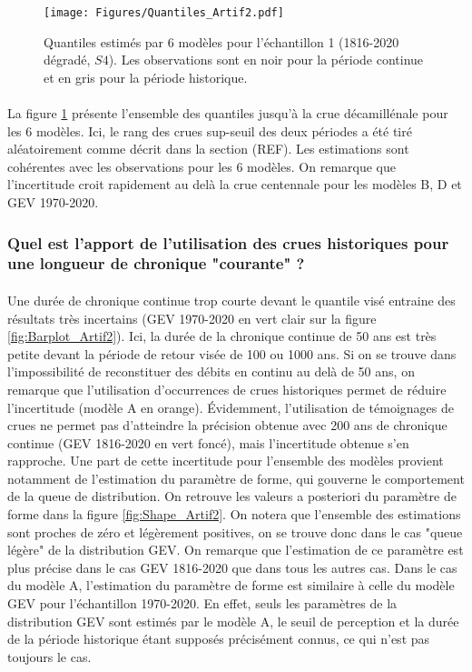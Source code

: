 \documentclass[11pt]{article}
\begin{document}
	\begin{figure}[h]
		\centering
		\texttt{[image: Figures/Quantiles\_Artif2.pdf]}	
		\caption{Quantiles estimés par 6 modèles pour l'échantillon 1 (1816-2020 dégradé, $S4$). Les observations sont en noir pour la période continue et en gris pour la période historique.}
		\label{fig:Quantiles_Artif2}
	\end{figure}
	
	\paragraph{} La figure \ref{fig:Quantiles_Artif2} présente l'ensemble des quantiles jusqu'à la crue décamillénale pour les 6 modèles. Ici, le rang des crues sup-seuil des deux périodes a été tiré aléatoirement comme décrit dans la section (REF). Les estimations sont cohérentes avec les observations pour les 6 modèles. On remarque que l'incertitude croit rapidement au delà la crue centennale pour les modèles B, D et GEV 1970-2020. 

\FloatBarrier
	
	\subsubsection{Quel est l'apport de l'utilisation des crues historiques pour une longueur de chronique "courante" ?}
	
	\paragraph{} Une durée de chronique continue trop courte devant le quantile visé entraine des résultats très incertains (GEV 1970-2020 en vert clair sur la figure \ref{fig:Barplot_Artif2}). Ici, la durée de la chronique continue de 50 ans est très petite devant la période de retour visée de 100 ou 1000 ans. Si on se trouve dans l'impossibilité de reconstituer des débits en continu au delà de 50 ans, on remarque que l'utilisation d'occurrences de crues historiques permet de réduire l'incertitude (modèle A en orange). Évidemment, l'utilisation de témoignages de crues ne permet pas d'atteindre la précision obtenue avec 200 ans de chronique continue (GEV 1816-2020 en vert foncé), mais l'incertitude obtenue s'en rapproche. Une part de cette incertitude pour l'ensemble des modèles provient notamment de l'estimation du paramètre de forme, qui gouverne le comportement de la queue de distribution. On retrouve les valeurs a posteriori du paramètre de forme dans la figure \ref{fig:Shape_Artif2}. On notera que l'ensemble des estimations sont proches de zéro et légèrement positives, on se trouve donc dans le cas "queue légère" de la distribution GEV. On remarque que l'estimation de ce paramètre est plus précise dans le cas GEV 1816-2020 que dans tous les autres cas. Dans le cas du modèle A, l'estimation du paramètre de forme est similaire à celle du modèle GEV pour l'échantillon 1970-2020. En effet, seuls les paramètres de la distribution GEV sont estimés par le modèle A, le seuil de perception et la durée de la période historique étant supposés précisément connus, ce qui n'est pas toujours le cas. 
	
\end{document}
